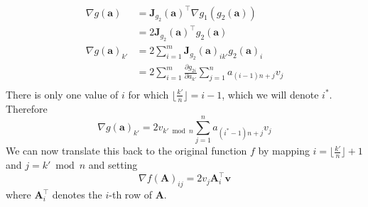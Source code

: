 \documentclass{article}
\begin{document}
\begin{enumerate}[label=\arabic*.]
\begin{enumerate}[label=\alph*.]
{		\begin{align*}
		\nabla g(\mathbf{a}) &= \mathbf{J}_{g_2}(\mathbf{a})^\top\nabla g_1(g_2(\mathbf{a}))\\ 
		&= 2\mathbf{J}_{g_2}(\mathbf{a})^\top g_2(\mathbf{a})\\
		\nabla g(\mathbf{a})_{k'} &= 2\sum_{i=1}^m\mathbf{J}_{g_2}(\mathbf{a})_{ik'}g_2(\mathbf{a})_i\\
		&= 2\sum_{i=1}^m \frac{\partial g_{2i}}{\partial a_{k'}}\sum_{j=1}^n a_{(i-1)n + j}v_j\\
		\end{align*}
	There is only one value of $i$ for which $\lfloor \frac{k'}{n}\rfloor = i-1$, which we will denote $i^*$. Therefore
	$$\nabla g(\mathbf{a})_{k'} = 2v_{k' \bmod{n}}\sum_{j=1}^n a_{(i^*-1)n + j}v_j$$
	We can now translate this back to the original function $f$ by mapping $i = \lfloor \frac{k'}{n}\rfloor + 1$ and $j = k' \bmod{n}$ and setting
	$$\nabla f(\mathbf{A})_{ij} = 2v_j\mathbf{A}^\top_i\mathbf{v}$$
	where $\mathbf{A}^\top_i$ denotes the $i$-th row of $\mathbf{A}$.
	}
	\end{enumerate}
\end{enumerate}
\end{document}
